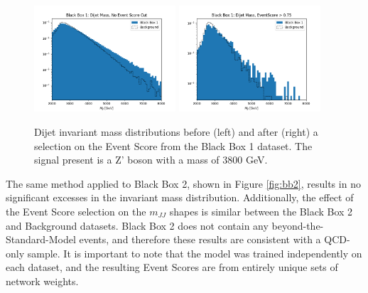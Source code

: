 \documentclass[letterpaper,11pt]{article}
\begin{document}
\begin{figure}[h!]
	\begin{center}
		\includegraphics[width=0.47\textwidth]{imgs/BB1.png}
		\includegraphics[width=0.47\textwidth]{imgs/BB1_Cut.png}
	\end{center}
	\caption{Dijet invariant mass distributions before (left) and after (right) a selection on the Event Score from the Black Box 1 dataset. The signal present is a Z' boson with a mass of 3800 GeV.}
	\label{fig:bb1}
\end{figure}

The same method applied to Black Box 2, shown in Figure \ref{fig:bb2}, results in no significant excesses in the invariant mass distribution. Additionally, the effect of the Event Score selection on the $m_{JJ}$ shapes is similar between the Black Box 2 and Background datasets. Black Box 2 does not contain any beyond-the-Standard-Model events, and therefore these results are consistent with a QCD-only sample. It is important to note that the model was trained independently on each dataset, and the resulting Event Scores are from entirely unique sets of network weights.
\end{document}
